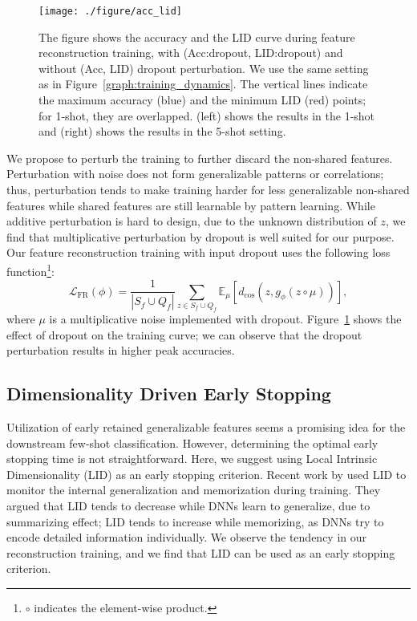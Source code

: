 \documentclass{article}
\begin{document}
\begin{figure}[ht]
	\vskip -0.1in
	\begin{center}
		\centerline{\texttt{[image: ./figure/acc\_lid]}}
		\vskip -0.15in
		\caption{
			The figure shows the accuracy and the LID curve during feature reconstruction training, with (Acc:dropout, LID:dropout) and without (Acc, LID) dropout perturbation.
			We use the same setting as in Figure~\ref{graph:training_dynamics}.
			The vertical lines indicate the maximum accuracy (blue) and the minimum LID (red) points; for 1-shot, they are overlapped.
			(left) shows the results in the 1-shot and (right) shows the results in the 5-shot setting.
		}
		\label{graph:lids}
	\end{center}
	\vskip -0.25in
\end{figure}
We propose to perturb the training to further discard the non-shared features.  Perturbation with noise does not form generalizable patterns or correlations; thus, perturbation tends to make training harder for less generalizable non-shared features while shared features are still learnable by pattern learning. While additive perturbation is hard to design, due to the unknown distribution of $z$, we find that multiplicative perturbation by dropout \cite{dropout} is well suited for our purpose. Our feature reconstruction training with input dropout uses the following loss function\footnote{$\circ$ indicates the element-wise product.}:
\begin{equation}
\label{equation:loss}
\mathcal{L}_{\text{FR}}(\phi) = \frac{1}{|S_f\cup Q_f|}\sum_{z\in S_f\cup Q_f}\mathbb{E}_\mu [d_\text{cos}(z, g_\phi(z \circ \mu))],
\end{equation}
where $\mu$ is a multiplicative noise implemented with dropout.
Figure~\ref{graph:lids} shows the effect of dropout on the training curve; we can observe that the dropout perturbation results in higher peak accuracies. \subsection{Dimensionality Driven Early Stopping}
\label{subsection:early_stopping}
Utilization of early retained generalizable features seems a promising idea for the downstream few-shot classification. However, determining the optimal early stopping time is not straightforward. Here, we suggest using Local Intrinsic Dimensionality (LID) as an early stopping criterion. Recent work by \citet{Ma18b} used LID to monitor the internal generalization and memorization during training.
They argued that LID tends to decrease while DNNs learn to generalize, due to summarizing effect; LID tends to increase while memorizing, as DNNs try to encode detailed information individually.
We observe the tendency in our reconstruction training, and we find that LID can be used as an early stopping criterion.
\end{document}
